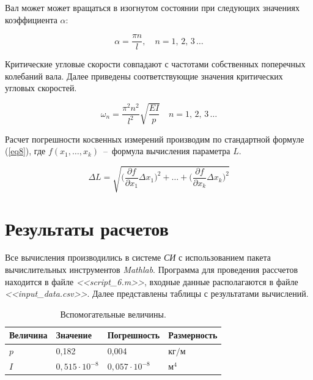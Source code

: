 \documentclass[12pt, a4paper]{article}
\begin{document}
    Вал может может вращаться в изогнутом состоянии при следующих значениях коэффициента $\alpha$:
    
    \begin{equation}
        \alpha = \frac{\pi n}{l}, \quad
        n = 1, \, 2, \, 3 \, \ldots
        \label{eq6}
    \end{equation}
    
    Критические угловые скорости совпадают с частотами собственных поперечных колебаний вала. Далее приведены соответствующие значения критических угловых скоростей.
    
    \begin{equation}
        \omega_{n} = \frac{\pi^{2} n^{2}}{l^{2}} \sqrt{\frac{EI}{p}} \quad
        n = 1, \, 2, \, 3 \, \ldots
        \label{eq7}
    \end{equation}
    
    Расчет погрешности косвенных измерений производим по стандартной формуле (\ref{eq8}), где $f(x_{1}, \ldots, x_{k})$~--~формула вычисления параметра $L$.
    
    \begin{equation}
        \Delta L = \sqrt{\Big (\frac{\partial f}{\partial x_{1}} \Delta x_{1} \Big )^2 + \ldots + \Big (\frac{\partial f}{\partial x_{k}} \Delta x_{k} \Big )^2}
        \label{eq8}
    \end{equation}
    
    \newpage
    
    \section{Результаты расчетов}
    
    Все вычисления производились в системе \textit{СИ} с использованием пакета вычислительных инструментов \textit{Mathlab}. Программа для проведения рассчетов находится в файле \textit{<<script\_6.m>>}, входные данные располагаются в файле \textit{<<input\_data.csv>>}. Далее представлены таблицы с результатами вычислений.
    
    \begin{longtable}{| M{2cm} | M{3cm} | M{3cm} | M{3cm} |}
        \caption{\centering Вспомогательные величины.}
        \label{tb2} \\
        \hline
        Величина & Значение & Погрешность & Размерность \\
        \hline
        $p$ & 0,182 & 0,004 & $\text{кг} / \text{м}$ \\
        $I$ & $0,515 \cdot 10^{-8}$ & $0,057 \cdot 10^{-8}$ & $\text{м}^{4}$ \\
        \hline
    \end{longtable}
    
\end{document}
